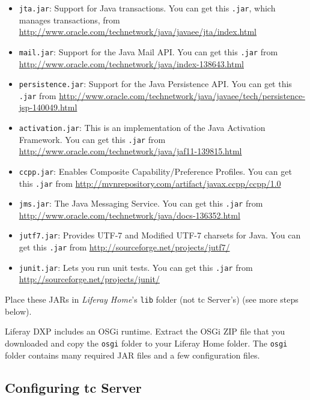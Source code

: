 \begin{itemize}
\item
  \texttt{jta.jar}: Support for Java transactions. You can get this
  \texttt{.jar}, which manages transactions, from
  \url{http://www.oracle.com/technetwork/java/javaee/jta/index.html}
\item
  \texttt{mail.jar}: Support for the Java Mail API. You can get this
  \texttt{.jar} from
  \url{http://www.oracle.com/technetwork/java/index-138643.html}
\item
  \texttt{persistence.jar}: Support for the Java Persistence API. You
  can get this \texttt{.jar} from
  \url{http://www.oracle.com/technetwork/java/javaee/tech/persistence-jsp-140049.html}
\item
  \texttt{activation.jar}: This is an implementation of the Java
  Activation Framework. You can get this \texttt{.jar} from
  \href{http://www.oracle.com\%20/technetwork/java/jaf11-139815.html}{http://www.oracle.com/technetwork/java/jaf11-139815.html}
\item
  \texttt{ccpp.jar}: Enables Composite Capability/Preference Profiles.
  You can get this \texttt{.jar} from
  \url{http://mvnrepository.com/artifact/javax.ccpp/ccpp/1.0}
\item
  \texttt{jms.jar}: The Java Messaging Service. You can get this
  \texttt{.jar} from
  \url{http://www.oracle.com/technetwork/java/docs-136352.html}
\item
  \texttt{jutf7.jar}: Provides UTF-7 and Modified UTF-7 charsets for
  Java. You can get this \texttt{.jar} from
  \url{http://sourceforge.net/projects/jutf7/}
\item
  \texttt{junit.jar}: Lets you run unit tests. You can get this
  \texttt{.jar} from \url{http://sourceforge.net/projects/junit/}
\end{itemize}

Place these JARs in \emph{Liferay Home}'s \texttt{lib} folder (not tc
Server's) (see more steps below).

Liferay DXP includes an OSGi runtime. Extract the OSGi ZIP file that you
downloaded and copy the \texttt{osgi} folder to your Liferay Home
folder. The \texttt{osgi} folder contains many required JAR files and a
few configuration files.

\subsection{Configuring tc Server}\label{configuring-tc-server}

